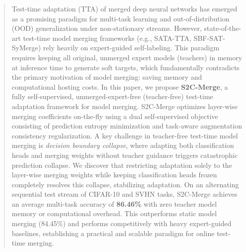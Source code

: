 \documentclass{article}
\theoremstyle{plain}
\theoremstyle{definition}
\theoremstyle{remark}
\begin{document}

\printAffiliationsAndNotice{}  %

\begin{abstract}
Test-time adaptation (TTA) of merged deep neural networks has emerged as a promising paradigm for multi-task learning and out-of-distribution (OOD) generalization under non-stationary streams. However, state-of-the-art test-time model merging frameworks (e.g., SATA-TTA, SBF-SAT-SyMerge) rely heavily on expert-guided self-labeling. This paradigm requires keeping all original, unmerged expert models (teachers) in memory at inference time to generate soft targets, which fundamentally contradicts the primary motivation of model merging: saving memory and computational hosting costs. In this paper, we propose \textbf{S2C-Merge}, a fully self-supervised, unmerged-expert-free (teacher-free) test-time adaptation framework for model merging. S2C-Merge optimizes layer-wise merging coefficients on-the-fly using a dual self-supervised objective consisting of prediction entropy minimization and task-aware augmentation consistency regularization. A key challenge in teacher-free test-time model merging is \emph{decision boundary collapse}, where adapting both classification heads and merging weights without teacher guidance triggers catastrophic prediction collapse. We discover that restricting adaptation solely to the layer-wise merging weights while keeping classification heads frozen completely resolves this collapse, stabilizing adaptation. On an alternating sequential test stream of CIFAR-10 and SVHN tasks, S2C-Merge achieves an average multi-task accuracy of \textbf{86.46\%} with zero teacher model memory or computational overhead. This outperforms static model merging (84.45\%) and performs competitively with heavy expert-guided baselines, establishing a practical and scalable paradigm for online test-time merging.
\end{abstract}
\end{document}
